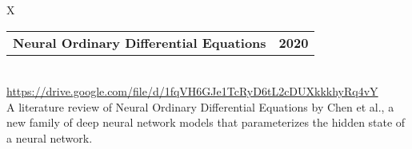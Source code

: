 \documentclass[10pt]{article}
\newcommand{\tabularxwidth}{\textwidth}
\begin{document}
    
        \begin{minipage}{\tabularxwidth}
        \begin{tabularx}{\tabularxwidth}{X}
            {
                \begin{tabularx}{\tabularxwidth}{@{}X r}
                    \textbf{Neural Ordinary Differential Equations} &
                    \textbf{
        2020} \\
                \end{tabularx}
            } \\

            

            
                \url{https://drive.google.com/file/d/1fqVH6GJe1TcRyD6tL2cDUXkkkhyRq4vY} \\
            
            

            
    A literature review of Neural Ordinary Differential Equations by Chen et al., a new family of deep neural network models that parameterizes the hidden state of a neural network.
        \end{tabularx}
        
            \vspace{.3em}
        

        \end{minipage}
    
\end{document}
